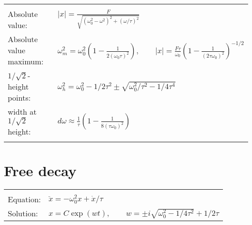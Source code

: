 \documentclass[a4paper]{article}
\begin{document}
\begin{tabular}{ll}
\\[5mm]\hline\\[-2mm]


Absolute value: &
$\displaystyle
|x| = \frac{F} {\sqrt{(\omega_0^2 - \omega^2)^2 + (\omega /\tau)^2}}
$\\[5mm]

Absolute value maximum: &
$\displaystyle
\omega_m^2 = \omega_0^2 \left(1 - \frac1{2(\omega_0\tau)^2}\right),
\qquad
|x| = \frac{F\tau}{\omega_0} \left(1 - \frac1{(2\tau\omega_0)^2}\right)^{-1/2}
$
\\[5mm]

$1/\sqrt2$-height points:&
$\displaystyle
\omega_h^2 = \omega_0^2 - 1/2\tau^2 \pm \sqrt{ \omega_0^2/\tau^2 - 1/4\tau^4}
$
\\[5mm]

width at $1/\sqrt2$ height:&
$\displaystyle
d\omega \approx \frac1{\tau} \left(1 - \frac1{8(\tau\omega_0)^2}\right)
$
\\[5mm]\hline\\[-2mm]

\end{tabular}

\section*{Free decay}
\begin{tabular}{ll}
\hline\\[-2mm]

Equation: &
$\displaystyle
\ddot x = -\omega^2_0 x + \dot x /\tau$
\\[5mm]

Solution: &
$\displaystyle
x = C \exp(wt),
\qquad
w = \pm i \sqrt{ \omega^2_0 - 1/4\tau^2} + 1/2\tau
$
\\[5mm]

\end{tabular}

\end{document}
